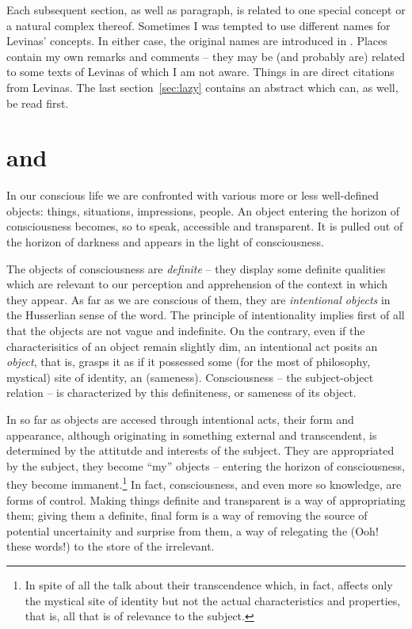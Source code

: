 Each subsequent section, as well as paragraph, is related to 
one special concept or a natural complex thereof. 
Sometimes I was tempted to use different names for Levinas' concepts. In either case,
the original names are introduced in . Places 
contain my own remarks and comments -- they may be (and probably are) related to some texts of 
Levinas of which I am not aware. Things in  are direct 
citations from Levinas. The last section~\ref{sec:lazy} contains an abstract 
which can, as well, be read first.

\section{ and }
\vspace*{-2ex}
In our conscious life we are confronted with various more or less well-defined objects:
things, situations, impressions, people. An object entering the horizon of consciousness
becomes, so to speak, accessible and transparent. It is pulled out of the horizon of
darkness and appears in the light of consciousness.

The objects of consciousness are {\em definite} -- 
they display some definite qualities which are relevant to our perception and 
apprehension of the context in which they appear. 
As far as we are conscious of them, they are 
{\em intentional objects} in the Husserlian sense of the word. The principle of 
intentionality implies first of all that the objects are not vague and indefinite. On
the contrary, even if the characterisitics of an object remain slightly dim, an 
intentional act posits an {\em object}, that is, grasps it as if it possessed some
(for the most of philosophy, mystical) site of identity, an  (sameness).
Consciousness -- the subject-object relation -- is characterized by this
definiteness, or sameness of its object. 

In so far as objects are accesed through intentional acts, their form and appearance, 
although originating in something external 
and transcendent, is determined by the attitutde and interests of
the subject. 
They are appropriated by the subject, they become ``my'' objects -- entering the horizon of
consciousness, they become immanent.\footnote{In spite of all the talk about their
transcendence which, in fact, affects only the mystical site of identity but not the
actual characteristics and properties, that is, all that is of relevance to the subject.}
In fact, consciousness, and even more so 
knowledge, are forms of control. 
Making things definite and transparent is a way of
appropriating them; giving them a definite, final form is a way of 
removing the source of
potential uncertainity and surprise from them, a way of relegating the  
(Ooh! these words!) to the store of the irrelevant.

